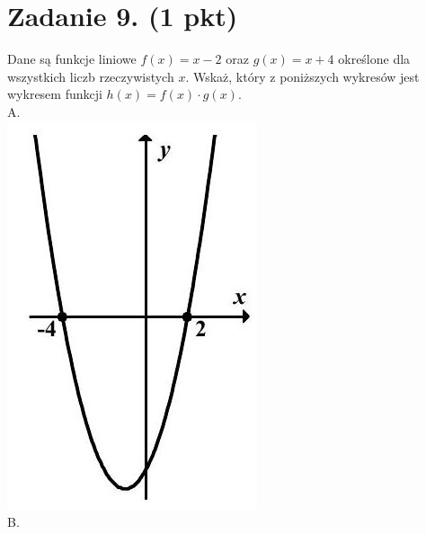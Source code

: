 \documentclass[10pt]{article}
\begin{document}
\section*{Zadanie 9. (1 pkt)}
Dane są funkcje liniowe \(f(x)=x-2\) oraz \(g(x)=x+4\) określone dla wszystkich liczb rzeczywistych \(x\). Wskaż, który z poniższych wykresów jest wykresem funkcji \(h(x)=f(x) \cdot g(x)\).\\
A.\\
\includegraphics[max width=\textwidth, center]{2024_11_21_5b6b7ffa9006e3f448adg-04}\\
B.\\
\end{document}
